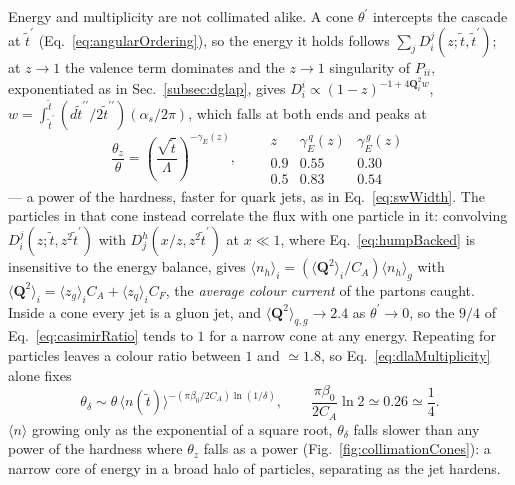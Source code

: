 Energy and multiplicity are not collimated alike. A cone \(\theta^\prime\) intercepts
the cascade at \(\tilde{t}^\prime\) (Eq.~\ref{eq:angularOrdering}), so the energy it
holds follows \(\sum_jD^j_i(z;\tilde{t},\tilde{t}^\prime)\); at \(z\to1\) the valence
term dominates and the \(z\to1\) singularity of \(P_{ii}\), exponentiated as in
Sec.~\ref{subsec:dglap}, gives \(D^i_i\propto(1-z)^{-1+4\mathbf{Q}_i^2w}\),
\(w=\int_{\tilde{t}^\prime}^{\tilde{t}}
(d\tilde{t}^{\prime\prime}/2\tilde{t}^{\prime\prime})(\alpha_s/2\pi)\), which falls at
both ends and peaks at
\begin{equation}
	\frac{\theta_z}{\theta} =
	\left(\frac{\sqrt{\tilde{t}}}{\Lambda}\right)^{-\gamma_E(z)},
	\qquad
	\begin{array}{r|cc}
		z & \gamma_E^{\,q}(z) & \gamma_E^{\,g}(z) \\ \hline
		0.9 & 0.55 & 0.30 \\
		0.5 & 0.83 & 0.54
	\end{array}
	\label{eq:energyCollimation}
\end{equation}
--- a power of the hardness, faster for quark jets, as in Eq.~\ref{eq:swWidth}. The
particles in that cone instead correlate the flux with one particle in it: convolving
\(D^j_i(z;\tilde{t},z^2\tilde{t}^\prime)\) with \(D^h_j(x/z,z^2\tilde{t}^\prime)\) at
\(x\ll1\), where Eq.~\ref{eq:humpBacked} is insensitive to the energy balance, gives
\(\langle n_h\rangle_i=(\langle\mathbf{Q}^2\rangle_i/C_A)\langle n_h\rangle_g\) with
\(\langle\mathbf{Q}^2\rangle_i=\langle z_g\rangle_iC_A+\langle z_q\rangle_iC_F\), the
\emph{average colour current} of the partons caught. Inside a cone every jet is a
gluon jet, and \(\langle\mathbf{Q}^2\rangle_{q,g}\to2.4\) as \(\theta^\prime\to0\), so
the \(9/4\) of Eq.~\ref{eq:casimirRatio} tends to \(1\) for a narrow cone at any
energy. Repeating for particles leaves a colour ratio between \(1\) and
\(\simeq1.8\), so Eq.~\ref{eq:dlaMultiplicity} alone fixes
\begin{equation}
	\theta_\delta \sim \theta\,
	\langle n(\tilde{t})\rangle^{-(\pi\beta_0/2C_A)\ln(1/\delta)} ,
	\qquad
	\frac{\pi\beta_0}{2C_A}\ln 2 \simeq 0.26 \simeq \frac{1}{4} .
	\label{eq:multCollimation}
\end{equation}
\(\langle n\rangle\) growing only as the exponential of a square root,
\(\theta_\delta\) falls slower than any power of the hardness where \(\theta_z\) falls
as a power (Fig.~\ref{fig:collimationCones}): a narrow core of energy in a broad halo
of particles, separating as the jet hardens.

